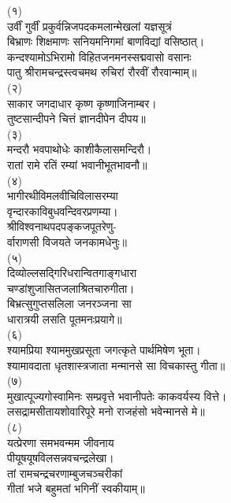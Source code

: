\begin{center}
(१)\nopagebreak\\
उर्वीं गुर्वीं प्रकुर्वन्निजपदकमलान्मेखलां यज्ञसूत्रं\nopagebreak\\
बिभ्राणः शिक्षमाणः सनियमनिगमां बाणविद्यां वसिष्ठात्।\nopagebreak\\
कन्दश्यामोऽभिरामो विहितजनमनस्सद्मवासो वसानः\nopagebreak\\
पातु श्रीरामचन्द्रस्त्वचमथ रुचिरां रौरवीं रौरवान्माम्॥\\
(२)\nopagebreak\\
साकार जगदाधार कृष्ण कृष्णाजिनाम्बर।\nopagebreak\\
तुष्टसान्दीपने चित्तं ज्ञानदीपेन दीपय॥\\
(३)\nopagebreak\\
मन्दरौ भवपाथोधेः काशीकैलासमन्दिरौ।\nopagebreak\\
रातां रामे रतिं रम्यां भवानीभूतभावनौ॥\\
(४)\nopagebreak\\
भागीरथीविमलवीचिविलासरम्या\nopagebreak\\
वृन्दारकाविबुधवन्दिवरप्रणम्या।\nopagebreak\\
श्रीविश्वनाथपदपङ्कजपूतरेणु-\nopagebreak\\
र्वाराणसी विजयते जनकामधेनुः॥\\
(५)\nopagebreak\\
दिव्योल्लसद्गिरिधरान्वितगाङ्गधारा\nopagebreak\\
चण्डांशुजासितजलाश्रितचारुगीता।\nopagebreak\\
बिभ्रत्सुगुप्तसलिला जनरञ्जना सा\nopagebreak\\
धारात्रयी लसति पूतमनःप्रयागे॥\\
(६)\nopagebreak\\
श्यामप्रिया श्याममुखप्रसूता जगत्कृते पार्थमिषेण भूता।\nopagebreak\\
श्यामावदाता धृतशास्त्रजाता मन्मानसे सा विचकास्तु गीता॥\\
(७)\nopagebreak\\
मुखात्पूज्यगोस्वामिनः सम्प्रवृत्ते भवानीपतेः काकवर्यस्य वित्ते।\nopagebreak\\
लसद्रामसीतायशोवारिपूरे मनो राजहंसो भवेन्मानसे मे॥\\
(८)\nopagebreak\\
यत्प्रेरणा समभवन्मम जीवनाय\nopagebreak\\
पीयूषयूषविलसन्नवचन्द्रलेखा।\nopagebreak\\
तां रामचन्द्रचरणाम्बुजचञ्चरीकां\nopagebreak\\
गीतां भजे बहुमतां भगिनीं स्वकीयाम्॥\\

\end{center}
